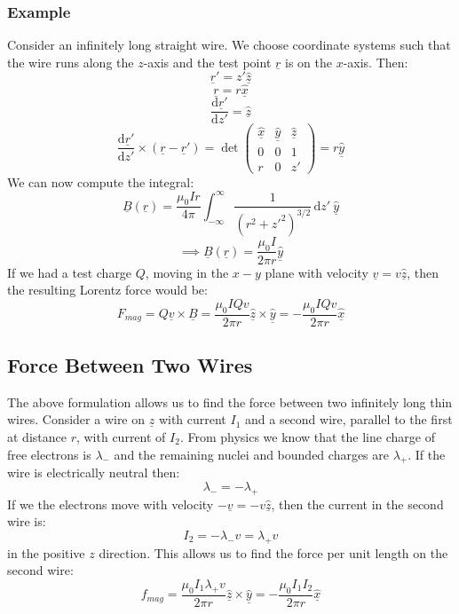 \documentclass[12pt]{article}
\newcommand{\df}[2]{\frac{\text{d}#1}{\text{d}#2}}
\begin{document}
\subsubsection{Example}
Consider an infinitely long straight wire. We choose coordinate systems such that the wire runs along the \(z\)-axis and the test point \(\underline{r}\) is on the \(x\)-axis. Then:
\[\underline{r}'=z'\underline{\hat{z}}\]
\[\underline{r}=r\underline{\hat{x}}\]
\[\df{\underline{r}'}{z'}=\underline{\hat{z}}\]
\[\df{\underline{r}'}{z'}\times(\underline{r}-\underline{r}')=\det\begin{pmatrix}
    \underline{\hat{x}} &\underline{\hat{y}} & \underline{\hat{z}} \\
    0 & 0& 1 \\
    r & 0 & z'
\end{pmatrix}=r\underline{\hat{y}}\]
We can now compute the integral:
\[\underline{B}(\underline{r})=\frac{\mu_0Ir}{4\pi}\int^\infty_{-\infty}\frac{1}{(r^2+z'^2)^{3/2}}\,\text{d}z'\ \underline{\hat{y}}\]
\[\implies \underline{B}(\underline{r})=\frac{\mu_0I}{2\pi r}\underline{\hat{y}}\]
If we had a test charge \(Q\), moving in the \(x-y\) plane with velocity \(\underline{v}=v\underline{\hat{z}}\), then the resulting Lorentz force would be:
\[F_{mag}=Q\underline{v}\times \underline{B}=\frac{\mu_0IQv}{2\pi r}\underline{\hat{z}}\times\underline{\hat{y}}=-\frac{\mu_0IQv}{2\pi r}\underline{\hat{x}}\]
\subsection{Force Between Two Wires}
The above formulation allows us to find the force between two infinitely long thin wires. Consider a wire on \(\underline{z}\) with current \(I_1\) and a second wire, parallel to the first at distance \(r\), with current of \(I_2\). From physics we know that the line charge of free electrons is \(\lambda_-\) and the remaining nuclei and bounded charges are \(\lambda_+\). If the wire is electrically neutral then:
\[\lambda_-=-\lambda_+\]
If we the electrons move with velocity \(-\underline{v}=-v\underline{\hat{z}}\), then the current in the second wire is:
\[I_2=-\lambda_-v=\lambda_+v\]
in the positive \(z\) direction. This allows us to find the force per unit length on the second wire:
\[f_{mag}=\frac{\mu_0I_1\lambda_+v}{2\pi r}\underline{\hat{z}}\times \underline{\hat{y}}=-\frac{\mu_0I_1I_2}{2\pi r}\underline{\hat{x}}\]
\end{document}
